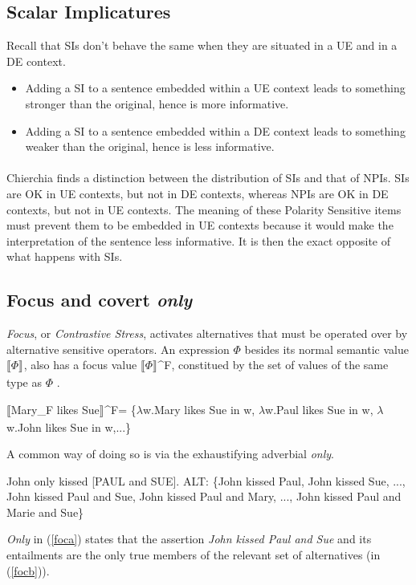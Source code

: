\documentclass[a4paper,11pt]{article}
\newcommand{\reff}[1]{(\ref{#1})}
\newcommand{\eval}[2][]{$\llbracket$#2$\rrbracket_{#1}$}
\newcommand{\exs}[2][]{\begin{exe}\ex #1 \begin{xlist}#2\end{xlist}\end{exe}}
\begin{document}
  
\subsection{Scalar Implicatures}\label{subsec:SIs}
Recall that SIs don't behave the same when they are situated in a UE and in a DE context.

\begin{itemize}
  \item Adding a SI to a sentence embedded within a UE context leads to something stronger than the original, hence is more informative.
  \item Adding a SI to a sentence embedded within a DE context leads to something weaker than the original, hence is less informative.
\end{itemize}
  
\paragraph{}
Chierchia finds a distinction between the distribution of SIs and that of NPIs. SIs are OK in UE contexts, but not in DE contexts, whereas NPIs are OK in DE contexts, but not in UE contexts. The meaning of these Polarity Sensitive items must prevent them to be embedded in UE contexts because it would make the interpretation of the sentence less informative. It is then the exact opposite of what happens with SIs.

\subsection{Focus and covert \emph{only}}
\emph{Focus}, or \emph{Contrastive Stress},  activates alternatives that must be operated over by alternative sensitive operators. An expression $\Phi$ besides its normal semantic value \eval{$\Phi$}, also has a focus value \eval{$\Phi$}^F, constitued by the set of values of the same type as $\Phi$ \citep{Roo92}. 

  \begin{exe}
    \ex\label{focval} \eval{Mary_F likes Sue}^F= \{$\lambda$w.Mary likes Sue in w, $\lambda$w.Paul likes Sue in w, $\lambda$w.John likes Sue in w,...\} 
  \end{exe}

A common way of doing so is via the exhaustifying adverbial \textit{only}.
  \exs{
    \ex\label{foca} John only kissed [PAUL and SUE].
    \ex\label{focb} ALT: \{John kissed Paul, John kissed Sue, ..., John kissed Paul and Sue, John kissed Paul and Mary, ..., John kissed Paul and Marie and Sue\}
  }
%
\emph{Only} in \reff{foca} states that the assertion \textit{John kissed Paul and Sue} and its entailments are the only true members of the relevant set of alternatives (in \reff{focb}).
\end{document}
